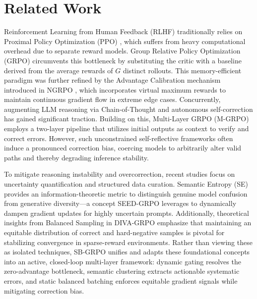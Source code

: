 \section{Related Work}

Reinforcement Learning from Human Feedback (RLHF) \cite{10.5555/3294996.3295184} traditionally relies on Proximal Policy Optimization (PPO) \cite{schulman2017proximalpolicyoptimizationalgorithms}, which suffers from heavy computational overhead due to separate reward models. Group Relative Policy Optimization (GRPO) \cite{shao2024deepseekmathpushinglimitsmathematical} circumvents this bottleneck by substituting the critic with a baseline derived from the average rewards of $G$ distinct rollouts. This memory-efficient paradigm was further refined by the Advantage Calibration mechanism introduced in NGRPO \cite{nan2025ngrponegativeenhancedgrouprelative}, which incorporates virtual maximum rewards to maintain continuous gradient flow in extreme edge cases. Concurrently, augmenting LLM reasoning via Chain-of-Thought \cite{10.5555/3600270.3602070} and autonomous self-correction \cite{madaan2023selfrefineiterativerefinementselffeedback} has gained significant traction. Building on this, Multi-Layer GRPO (M-GRPO) \cite{ding2025multilayergrpoenhancingreasoning} employs a two-layer pipeline that utilizes initial outputs as context to verify and correct errors. However, such unconstrained self-reflective frameworks often induce a pronounced correction bias, coercing models to arbitrarily alter valid paths and thereby degrading inference stability.

To mitigate reasoning instability and overcorrection, recent studies focus on uncertainty quantification and structured data curation. Semantic Entropy (SE) \cite{kuhn2023semanticuncertaintylinguisticinvariances} provides an information-theoretic metric to distinguish genuine model confusion from generative diversity---a concept SEED-GRPO \cite{chen2025seedgrposemanticentropyenhanced} leverages to dynamically dampen gradient updates for highly uncertain prompts. Additionally, theoretical insights from Balanced Sampling in DIVA-GRPO \cite{gao2026divagrpoenhancingmultimodalreasoning} emphasize that maintaining an equitable distribution of correct and hard-negative samples is pivotal for stabilizing convergence in sparse-reward environments. Rather than viewing these as isolated techniques, SB-GRPO unifies and adapts these foundational concepts into an active, closed-loop multi-layer framework: dynamic gating resolves the zero-advantage bottleneck, semantic clustering extracts actionable systematic errors, and static balanced batching enforces equitable gradient signals while mitigating correction bias.
